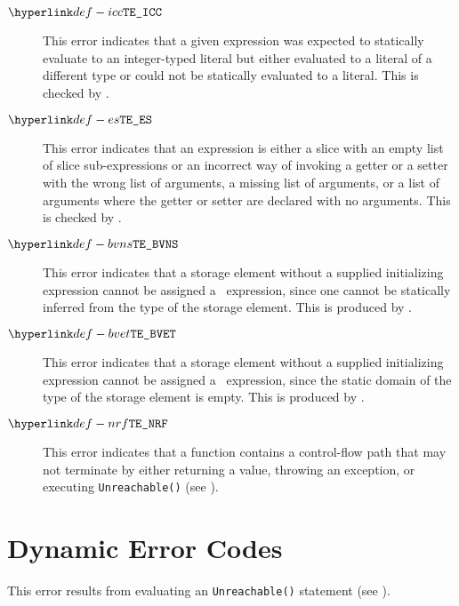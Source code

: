 \begin{description}
\hypertarget{def-icc}{}
\item[$\IntConstantExpected$]
This error indicates that a given expression was expected to statically evaluate
to an integer-typed literal but either evaluated to a literal of a different type
or could not be statically evaluated to a literal.
This is checked by .

\hypertarget{def-es}{}
\item[$\EmptySlice$]
This error indicates that an expression is either a slice with an empty list of slice sub-expressions
or an incorrect way of invoking a getter or a setter with the wrong list of arguments, a missing
list of arguments, or a list of arguments where the getter or setter are declared with no arguments.
This is checked by .

\hypertarget{def-bvns}{}
\item[$\BaseValueNonStatic$]
This error indicates that a storage element without a supplied initializing expression cannot be
assigned a \basevalueterm\ expression, since one cannot be statically inferred from the type of the
storage element.
This is produced by .

\hypertarget{def-bvet}{}
\item[$\BaseValueEmptyType$]
This error indicates that a storage element without a supplied initializing expression cannot be
assigned a \basevalueterm\ expression, since the static domain of the type of the storage element
is empty.
This is produced by .

\hypertarget{def-nrf}{}
\item[$\NonReturningFunction$]
This error indicates that a function contains a control-flow path that may not terminate by
either returning a value, throwing an exception, or executing \texttt{Unreachable()}
(see ).

\end{description}

\section{Dynamic Error Codes}
\begin{description}
\hypertarget{def-unr}{}
\item[$\UnreachableError$]
This error results from evaluating an \texttt{Unreachable()} statement (see ).
\end{description}
